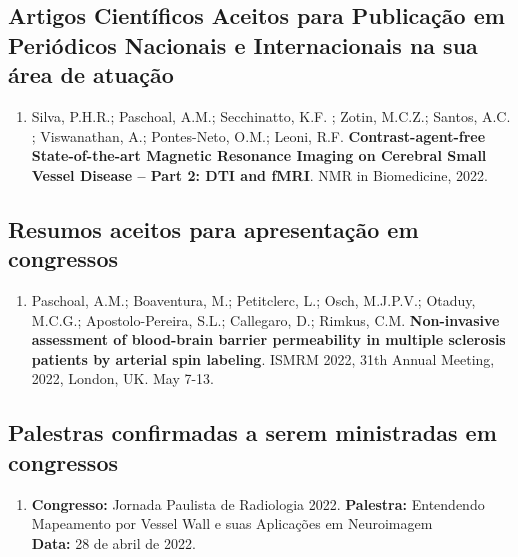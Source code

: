 \documentclass[a4paper,oneside,10pt]{article}
\begin{document}
\subsection{Artigos Científicos Aceitos para Publicação em Periódicos Nacionais e Internacionais na sua área de atuação}
\vspace{0.3cm}

\begin{enumerate}
        \renewcommand{\labelenumi}{{\large\bfseries\arabic{enumi}.}}
        
        \item Silva, P.H.R.; Paschoal, A.M.; Secchinatto, K.F. ; Zotin, M.C.Z.; Santos, A.C. ; Viswanathan, A.; Pontes-Neto, O.M.; Leoni, R.F. \textbf{Contrast-agent-free State-of-the-art Magnetic Resonance Imaging on Cerebral Small Vessel Disease – Part 2: DTI and fMRI}. NMR in Biomedicine, 2022.  %
        
\end{enumerate}

\subsection{Resumos aceitos para apresentação em congressos} %
\vspace{0.3cm}

\begin{enumerate}
\renewcommand{\labelenumi}{{\large\bfseries\arabic{enumi}.}}

        \item Paschoal, A.M.; Boaventura, M.; Petitclerc, L.; Osch, M.J.P.V.; Otaduy, M.C.G.; Apostolo-Pereira, S.L.; Callegaro, D.; Rimkus, C.M. \textbf{Non-invasive assessment of blood-brain barrier permeability in multiple sclerosis patients by arterial spin labeling}. ISMRM 2022, 31th Annual Meeting, 2022, London, UK. May 7-13. %

\end{enumerate}

\subsection{Palestras confirmadas a serem ministradas em congressos}
\vspace{0.3cm}

\begin{enumerate}
\renewcommand{\labelenumi}{{\large\bfseries\arabic{enumi}.}}

        \item \textbf{Congresso:} Jornada Paulista de Radiologia 2022. %
              \textbf{Palestra:} Entendendo Mapeamento por Vessel Wall e suas Aplicações em Neuroimagem\\
              \textbf{Data:} 28 de abril de 2022.
\end{enumerate}
\end{document}
